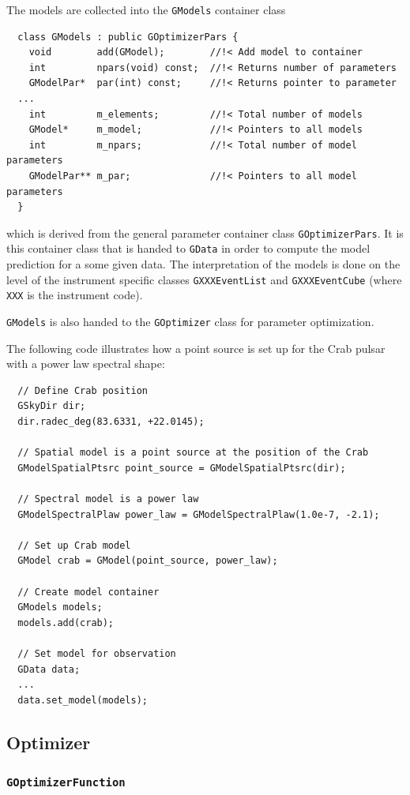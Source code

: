 \documentclass{article}[12pt,a4]
\begin{document}
The models are collected into the {\tt GModels} container class
\begin{verbatim}
  class GModels : public GOptimizerPars {
    void        add(GModel);        //!< Add model to container
    int         npars(void) const;  //!< Returns number of parameters
    GModelPar*  par(int) const;     //!< Returns pointer to parameter
  ...
    int         m_elements;         //!< Total number of models
    GModel*     m_model;            //!< Pointers to all models
    int         m_npars;            //!< Total number of model parameters
    GModelPar** m_par;              //!< Pointers to all model parameters
  }
\end{verbatim}
which is derived from the general parameter container class {\tt GOptimizerPars}.
It is this container class that is handed to {\tt GData} in order to compute the model
prediction for a some given data.
The interpretation of the models is done on the level of the instrument specific classes
{\tt GXXXEventList} and {\tt GXXXEventCube} (where {\tt XXX} is the instrument code).

{\tt GModels} is also handed to the {\tt GOptimizer} class for parameter optimization.

The following code illustrates how a point source is set up for the Crab pulsar with a
power law spectral shape:
\begin{verbatim}
  // Define Crab position
  GSkyDir dir;
  dir.radec_deg(83.6331, +22.0145);
  
  // Spatial model is a point source at the position of the Crab
  GModelSpatialPtsrc point_source = GModelSpatialPtsrc(dir);
  
  // Spectral model is a power law
  GModelSpectralPlaw power_law = GModelSpectralPlaw(1.0e-7, -2.1);
  
  // Set up Crab model
  GModel crab = GModel(point_source, power_law);
  
  // Create model container
  GModels models;
  models.add(crab);
  
  // Set model for observation
  GData data;
  ...
  data.set_model(models);
\end{verbatim}


\subsection{Optimizer}

\subsubsection{{\tt GOptimizerFunction}}
\end{document}
